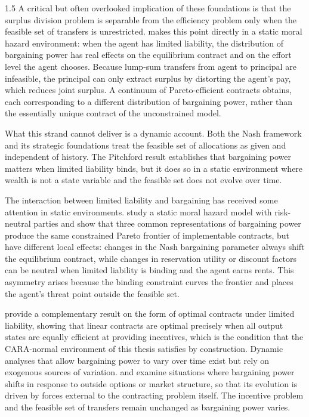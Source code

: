 \documentclass[12pt]{article}
\theoremstyle{definition}
\theoremstyle{plain}
\begin{document}
\begin{spacing}{1.5}
A critical but often overlooked implication of these foundations is that the surplus division problem is separable from the efficiency problem only when the feasible set of transfers is unrestricted. \textcite{pitchford1998} makes this point directly in a static moral hazard environment: when the agent has limited liability, the distribution of bargaining power has real effects on the equilibrium contract and on the effort level the agent chooses. Because lump-sum transfers from agent to principal are infeasible, the principal can only extract surplus by distorting the agent's pay, which reduces joint surplus. A continuum of Pareto-efficient contracts obtains, each corresponding to a different distribution of bargaining power, rather than the essentially unique contract of the unconstrained model. 

What this strand cannot deliver is a dynamic account. Both the Nash framework and its strategic foundations treat the feasible set of allocations as given and independent of history. The Pitchford result establishes that bargaining power matters when limited liability binds, but it does so in a static environment where wealth is not a state variable and the feasible set does not evolve over time.

The interaction between limited liability and bargaining has received some attention in  static environments. \textcite{demougin2006} study a static moral hazard model with risk-neutral parties and show that three common representations of bargaining power produce the same constrained Pareto frontier of implementable contracts, but have different local effects: changes in the Nash bargaining parameter always shift the equilibrium contract, while changes in reservation utility or discount factors can be neutral when limited liability is binding and the agent earns rents. This asymmetry arises  because the binding constraint curves the frontier and places the agent's threat point outside the feasible set. 

\textcite{poblete2009} provide a complementary result on the form of optimal contracts under limited liability, showing that linear contracts are optimal precisely when all output states are equally efficient at providing incentives, which is the condition that the CARA-normal environment of this thesis satisfies by construction. Dynamic analyses that allow bargaining power to vary over time exist but rely on exogenous sources of variation. \textcite{inderst2002} and \textcite{dittrich2015}  examine situations where bargaining power shifts in response to outside options or market structure, so that its evolution is driven by forces external to the contracting problem itself. The incentive problem and the feasible set of transfers remain unchanged as bargaining power varies.


\end{spacing}
\end{document}
